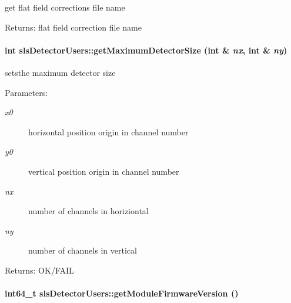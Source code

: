get flat field corrections file name 

\begin{Desc}
\item[Returns:]flat field correction file name \end{Desc}
\hypertarget{classslsDetectorUsers_588a5e1d231cd6778f6f78fdc53b9681}{
\paragraph[getMaximumDetectorSize]{\setlength{\rightskip}{0pt plus 5cm}int sls\-Detector\-Users::get\-Maximum\-Detector\-Size (int \& {\em nx}, int \& {\em ny})}\hfill}
\label{classslsDetectorUsers_588a5e1d231cd6778f6f78fdc53b9681}


setsthe maximum detector size 

\begin{Desc}
\item[Parameters:]
\begin{description}
\item[{\em x0}]horizontal position origin in channel number \item[{\em y0}]vertical position origin in channel number \item[{\em nx}]number of channels in horiziontal \item[{\em ny}]number of channels in vertical \end{description}
\end{Desc}
\begin{Desc}
\item[Returns:]OK/FAIL \end{Desc}
\hypertarget{classslsDetectorUsers_09ded3b9c81e4544d42bb0697c3b7624}{
\paragraph[getModuleFirmwareVersion]{\setlength{\rightskip}{0pt plus 5cm}int64\_\-t sls\-Detector\-Users::get\-Module\-Firmware\-Version ()}\hfill}
\label{classslsDetectorUsers_09ded3b9c81e4544d42bb0697c3b7624}


